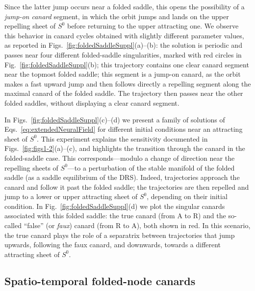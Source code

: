 \documentclass[aps,prl,reprint,superscriptaddress]{revtex4-1}
\begin{document}
Since the latter jump occurs near a folded saddle, this opens the possibility of a
\emph{jump-on canard} segment, in which the orbit jumps and lands on the upper
repelling sheet of $S^0$ before returning to the upper attracting one. We observe
this behavior in canard cycles obtained with slightly different parameter values, as
reported in Figs.~\ref{fig:foldedSaddleSuppl}(a)--(b): the solution is
periodic and passes near four different folded-saddle singularities, marked with red
circles in Fig.~\ref{fig:foldedSaddleSuppl}(b); this trajectory contains one clear
canard segment near the topmost folded saddle; this segment is a jump-on canard, as
the orbit makes a fast upward jump and then follows directly a repelling segment
along the maximal canard of the folded saddle. The trajectory then passes near the
other folded saddles, without displaying a clear canard segment.

In Figs.~\ref{fig:foldedSaddleSuppl}(c)--(d) we present a family of solutions of
Eqs.~\eqref{eq:extendedNeuralField} for different initial conditions near an
attracting sheet of $S^0$. This experiment explains the sensitivity documented in
Figs.~\ref{fig:figs1-2}(a)--(c), and highlights the transition through the canard in the
folded-saddle case. This corresponds---modulo a change of direction near the
repelling sheets of $S^0$---to a perturbation of the stable manifold of the folded
saddle (as a saddle equilibrium of the DRS). Indeed,
trajectories approach the canard and follow it past the folded saddle; the
trajectories are then repelled and jump to a lower or upper attracting sheet of
$S^0$, depending on their initial condition. In Fig.~\ref{fig:foldedSaddleSuppl}(d)
we plot the singular canards associated with
this folded saddle: the true canard (from A to R) and the so-called ``false'' (or
\textit{faux}) canard (from R to A), both shown in red. In this scenario, the true
canard plays the role of a separatrix between trajectories that jump upwards,
following the faux canard, and downwards, towards a different attracting sheet of
$S^0$.

\subsection{Spatio-temporal folded-node canards}
\end{document}
